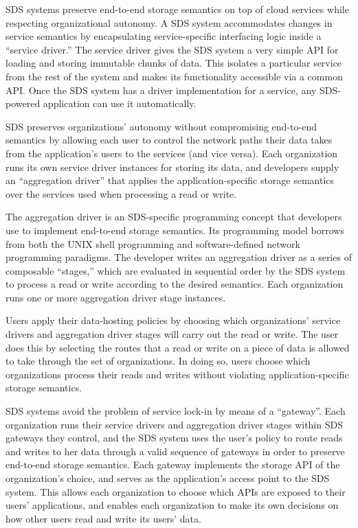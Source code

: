 SDS systems preserve end-to-end storage semantics on top of cloud services while respecting
organizational autonomy.  A SDS system accommodates changes in service semantics
by encapsulating service-specific interfacing logic inside a ``service driver.''
The service driver gives the SDS system a very simple API for loading and
storing immutable chunks of data.  This isolates a particular service from the rest of the
system and makes its functionality accessible via a common API.  Once the SDS system has a
driver implementation for a service, any SDS-powered application can use it
automatically.

SDS preserves organizations' autonomy without compromising end-to-end semantics by
allowing each user to control the network paths their data takes from the
application's users to the services (and vice versa).  Each organization runs its own
service driver instances for storing its data, and developers supply an
``aggregation driver'' that applies the application-specific storage semantics
over the services used when processing a read or write.

The aggregation driver is an SDS-specific programming concept that developers
use to implement end-to-end storage semantics.  Its
programming model borrows from both the UNIX shell programming and software-defined
network programming paradigms.  The developer writes an aggregation driver as a
series of composable ``stages,'' which are evaluated in sequential order by the
SDS system to process a read or write according to the desired semantics.
Each organization runs one or more aggregation driver stage instances.

Users apply their data-hosting policies by choosing which organizations' service
drivers and aggregation driver stages will carry out the read or write.  The
user does this by selecting the routes that a read or write on a piece of data
is allowed to take through the set of organizations.  In doing so, users choose
which organizations process their reads and writes without violating
application-specific storage semantics.

SDS systems avoid the problem of service lock-in by means of a ``gateway''.
Each organization runs their service drivers and aggregation driver stages
within SDS gateways they control, and the SDS system uses the user's policy
to route reads and writes to her data through a valid sequence of gateways 
in order to preserve end-to-end storage semantics.
Each gateway implements the storage API of the
organization's choice, and serves as the application's access point to the SDS
system.  This allows each organization to choose which APIs are exposed to their
users' applications, and enables each organization to make its own decisions on how
other users read and write its users' data.

